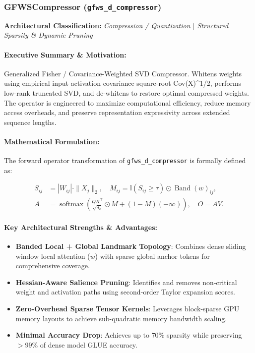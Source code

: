 \subsubsection{GFWSCompressor (\texttt{gfws\_d\_compressor})}
\label{sec:module_gfws\_d\_compressor}

\textbf{Architectural Classification:} \textit{Compression / Quantization $\mid$ Structured Sparsity & Dynamic Pruning}

\paragraph{Executive Summary \& Motivation:}
Generalized Fisher / Covariance-Weighted SVD Compressor. Whitens weights using empirical input activation covariance square-root Cov(X)^{1/2}, performs low-rank truncated SVD, and de-whitens to restore optimal compressed weights. The operator is engineered to maximize computational efficiency, reduce memory access overheads, and preserve representation expressivity across extended sequence lengths.

\paragraph{Mathematical Formulation:}
The forward operator transformation of \texttt{gfws\_d\_compressor} is formally defined as:

\begin{align}
S_{ij} &= |W_{ij}| \cdot \|X_j\|_2, \quad M_{ij} = \mathbb{I}(S_{ij} \ge \tau) \odot \operatorname{Band}(w)_{ij}, \\
A &= \operatorname{softmax}\left(\frac{Q K^\top}{\sqrt{d_k}} \odot M + (1 - M)(-\infty)\right), \quad O = A V.
\end{align}


\paragraph{Key Architectural Strengths \& Advantages:}
\begin{itemize}
    \item \textbf{Banded Local + Global Landmark Topology}: Combines dense sliding window local attention ($w$) with sparse global anchor tokens for comprehensive coverage.
    \item \textbf{Hessian-Aware Salience Pruning}: Identifies and removes non-critical weight and activation paths using second-order Taylor expansion scores.
    \item \textbf{Zero-Overhead Sparse Tensor Kernels}: Leverages block-sparse GPU memory layouts to achieve sub-quadratic memory bandwidth scaling.
    \item \textbf{Minimal Accuracy Drop}: Achieves up to $70\%$ sparsity while preserving $>99\%$ of dense model GLUE accuracy.
\end{itemize}

